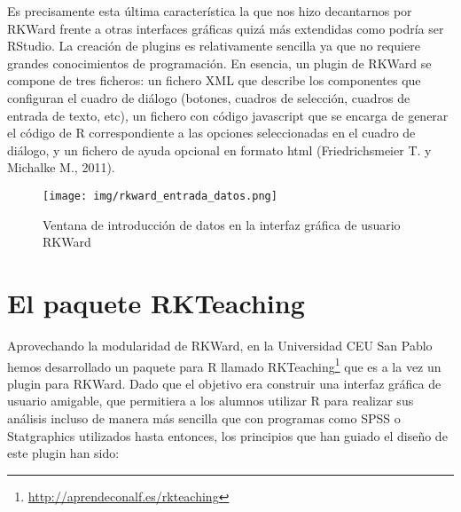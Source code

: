 \documentclass[10pt,twoside,spanish]{article}
\numberwithin{equation}{section}
\begin{document}
Es precisamente esta última característica la que nos hizo decantarnos por RKWard frente a otras interfaces gráficas quizá más extendidas
como podría ser RStudio. La creación de plugins es relativamente sencilla ya que no requiere grandes conocimientos de programación. En
esencia, un plugin de RKWard se compone de tres ficheros:
un fichero XML que describe los componentes que configuran el cuadro de diálogo (botones, cuadros de selección, cuadros de entrada de texto,
etc), un fichero con código javascript que se encarga de generar el código de R correspondiente a las opciones seleccionadas en el cuadro de
diálogo, y un fichero de ayuda opcional en formato html (Friedrichsmeier T. y Michalke M., 2011).

\begin{figure}[htp]
\begin{center}
  \texttt{[image: img/rkward\_entrada\_datos.png]}
  \caption{Ventana de introducción de datos en la interfaz gráfica de usuario RKWard}
  \label{g:RKWard_entrada_datos}
\end{center}
\end{figure}

\section{El paquete RKTeaching}
Aprovechando la modularidad de RKWard, en la Universidad CEU San Pablo hemos desarrollado un paquete para R llamado
RKTeaching\footnote{\url{http://aprendeconalf.es/rkteaching}} que es a la vez un plugin para RKWard.
Dado que el objetivo era construir una interfaz gráfica de usuario amigable, que permitiera a los alumnos utilizar R para realizar sus
análisis incluso de manera más sencilla que con programas como SPSS o Statgraphics utilizados hasta entonces, los principios que han guiado
el diseño de este plugin han sido:
\end{document}
